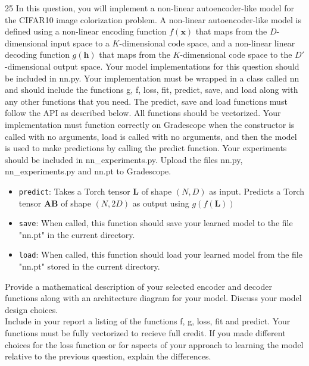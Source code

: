 \documentclass[11pt]{article}
\newcommand{\mbf}[1]{{\mathbf{#1}}}
\begin{document}
\begin{problem}{25} In this question, you will implement a non-linear autoencoder-like model for the CIFAR10 image colorization problem. A non-linear autoencoder-like model is defined using a non-linear encoding function $f(\mbf{x})$ that maps from the $D$-dimensional input space to a $K$-dimensional code space, and a non-linear linear decoding function $g(\mbf{h})$ that maps from the $K$-dimensional code space to the $D'$-dimensional output space. Your model implementations for this question should be included in nn.py. Your implementation must be wrapped in a class called nn and should include the functions g, f, loss, fit, predict, save, and load along with any other functions that you need. The  predict, save and load functions must follow the API as described below.  All functions should be vectorized. Your implementation must function correctly on Gradescope when the constructor is called with no arguments, load is called with no arguments, and then the model is used to make predictions by calling the predict function. Your experiments should be included in nn\_experiments.py. Upload the files nn.py, nn\_experiments.py and nn.pt to Gradescope.
    
\begin{itemize}

\item \verb|predict|: Takes a Torch tensor $\mbf{L}$ of shape $(N,D)$ as input. Predicts a Torch  tensor $\mbf{AB}$ of shape $(N,2D)$ as output using $g(f(\mbf{L}))$

\item \verb|save|: When called, this function should save your learned model to the file "nn.pt" in the current directory. 

\item \verb|load|: When called, this function should load your learned model from the file "nn.pt" stored in the current directory. 

\end{itemize}  

 Provide a mathematical description of your selected encoder and decoder functions along with an architecture diagram for your model. Discuss your model design choices.\\

 Include in your report a listing of the functions f, g, loss, fit and predict. Your functions must be fully vectorized to recieve full credit. If you made different choices for the loss function or for aspects of your approach to learning the model relative to the previous question, explain the differences.\\


\end{problem}
\end{document}
